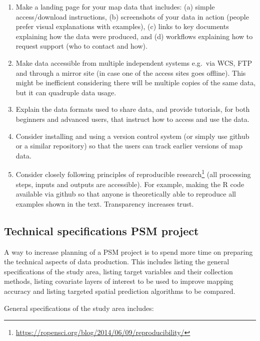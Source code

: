 \documentclass[graybox,natbib,nospthms,UStrade]{svmono}
\renewcommand{\href}[2]{#2 (\url{#1})}
\renewcommand{\href}[2]{#2\footnote{\url{#1}}}
\begin{document}
\begin{enumerate}
\def\labelenumi{\arabic{enumi}.}
\item
  Make a landing page for your map data that includes: (a) simple
  access/download instructions, (b) screenshots of your data in
  action (people prefer visual explanations with examples), (c)
  links to key documents explaining how the data were produced,
  and (d) workflows explaining how to request support (who to
  contact and how).
\item
  Make data accessible from multiple independent systems e.g.~via WCS,
  FTP and through a mirror site (in case one of the access sites
  goes offline). This might be inefficient considering there will be
  multiple copies of the same data, but it can quadruple data usage.
\item
  Explain the data formats used to share data, and provide tutorials,
  for both beginners and advanced users, that instruct how to access
  and use the data.
\item
  Consider installing and using a version control system (or simply
  use github or a similar repository) so that the users can track
  earlier versions of map data.
\item
  Consider closely following principles of \href{https://ropensci.org/blog/2014/06/09/reproducibility/}{reproducible research}
  (all processing steps, inputs and outputs are accessible). For
  example, making the R code available via github so that anyone is
  theoretically able to reproduce all examples shown in the text.
  Transparency increases trust.
\end{enumerate}

\hypertarget{technical-specifications-psm-project}{%
\subsection{Technical specifications PSM project}\label{technical-specifications-psm-project}}

A way to increase planning of a PSM project is to spend more time on preparing
the technical aspects of data production. This includes listing the general
specifications of the study area, listing target variables and their
collection methods, listing covariate layers of interest to be used to improve
mapping accuracy and listing targeted spatial prediction algorithms to be
compared.

General specifications of the study area includes:
\end{document}
